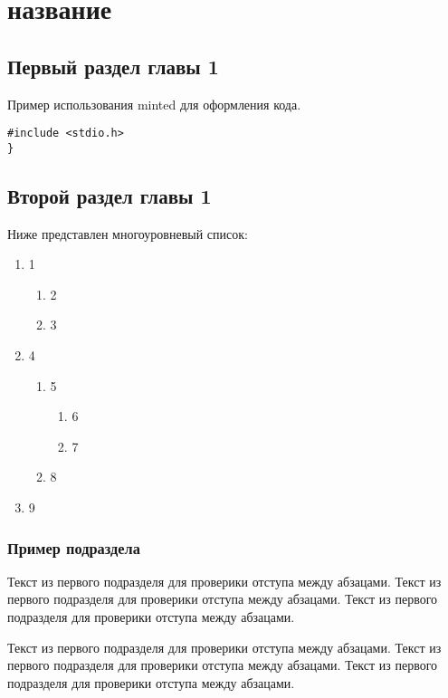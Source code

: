 \chapter{название}

\section{Первый раздел главы 1}

Пример использования minted для оформления кода.
\begin{code}
\label{code:pi-example}
\begin{verbatim}
#include <stdio.h>
}
\end{verbatim}
\end{code}

\section{Второй раздел главы 1}
Ниже представлен многоуровневый список:
\begin{enumerate}
 \item 1
 \begin{enumerate}
 \item 2
 \item 3
\end{enumerate}
\item 4
 \begin{enumerate}
 \item 5
  \begin{enumerate}
 \item 6
 \item 7
\end{enumerate}
 \item 8
\end{enumerate}
\item 9
\end{enumerate}

\subsection{Пример подраздела}
Текст из первого подразделя для проверики отступа между абзацами. Текст из первого подразделя для проверики отступа между абзацами. Текст из первого подразделя для проверики отступа между абзацами.

Текст из первого подразделя для проверики отступа между абзацами. Текст из первого подразделя для проверики отступа между абзацами. Текст из первого подразделя для проверики отступа между абзацами.

